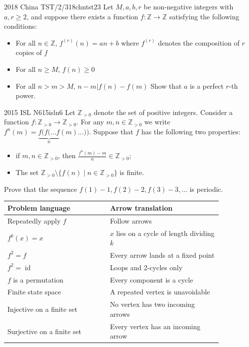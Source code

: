 \documentclass[11pt]{scrartcl}
\newcommand{\id}{\operatorname{id}}
\begin{document}
\begin{problem}{2018 China TST/2/3}{18chntst23}
  Let $M,a,b,r$ be non-negative integers with $a,r\ge 2$, and suppose there exists a function $f:\mathbb{Z}\rightarrow\mathbb{Z}$ satisfying the following conditions:
  \begin{itemize}
    \item For all $n\in \mathbb{Z}$, $f^{(r)}(n)=an+b$ where $f^{(r)}$ denotes the composition of $r$ copies of $f$
    \item For all $n\ge M$, $f(n)\ge 0$
    \item For all $n>m>M$, $n-m|f(n)-f(m)$
  Show that $a$ is a perfect $r$-th power.
  \end{itemize}
\end{problem}

\begin{problem}{2015 ISL N6}{15isln6}
  Let $\mathbb{Z}_{>0}$ denote the set of positive integers. Consider a function $f: \mathbb{Z}_{>0} \to \mathbb{Z}_{>0}$. For any $m, n \in \mathbb{Z}_{>0}$ we write $f^n(m) = \underbrace{f(f(\ldots f}_{n}(m)\ldots))$. Suppose that $f$ has the following two properties:

\begin{itemize}
  \item if $m, n \in \mathbb{Z}_{>0}$, then $\frac{f^n(m) - m}{n} \in \mathbb{Z}_{>0}$;
  \item The set $\mathbb{Z}_{>0} \setminus \{f(n) \mid n\in \mathbb{Z}_{>0}\}$ is finite.
\end{itemize} 

Prove that the sequence $f(1) - 1, f(2) - 2, f(3) - 3, \ldots$ is periodic.
\end{problem}

\begin{center}
\renewcommand{\arraystretch}{1.45}
\begin{tabular}{p{0.41\linewidth} p{0.45\linewidth}}
\textbf{Problem language} & \textbf{Arrow translation}\\
\hline
Repeatedly apply \(f\) & Follow arrows\\
\(f^k(x)=x\) & \(x\) lies on a cycle of length dividing \(k\)\\
\(f^2=f\) & Every arrow lands at a fixed point\\
\(f^2=\id\) & Loops and 2-cycles only\\
\(f\) is a permutation & Every component is a cycle\\
Finite state space & A repeated vertex is unavoidable\\
Injective on a finite set & No vertex has two incoming arrows\\
Surjective on a finite set & Every vertex has an incoming arrow\\
\end{tabular}
\end{center}
\end{document}
